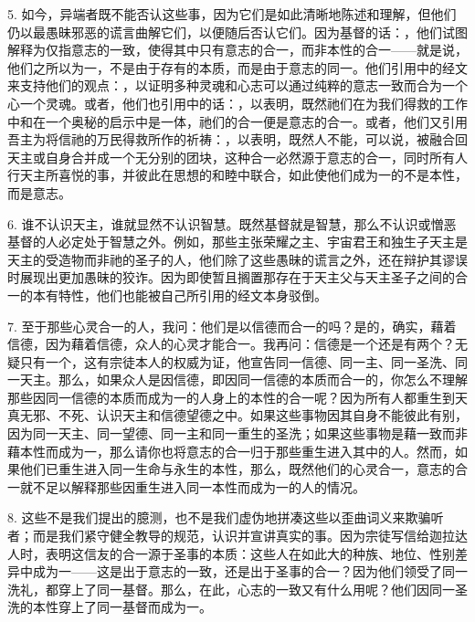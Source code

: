 5. 如今，异端者既不能否认这些事，因为它们是如此清晰地陈述和理解，但他们仍以最愚昧邪恶的谎言曲解它们，以便随后否认它们。因为基督的话：，他们试图解释为仅指意志的一致，使得其中只有意志的合一，而非本性的合一——就是说，他们之所以为一，不是由于存有的本质，而是由于意志的同一。他们引用中的经文来支持他们的观点：，以证明多种灵魂和心志可以通过纯粹的意志一致而合为一个心一个灵魂。或者，他们也引用中的话：，以表明，既然祂们在为我们得救的工作中和在一个奥秘的启示中是一体，祂们的合一便是意志的合一。或者，他们又引用吾主为将信祂的万民得救所作的祈祷：，以表明，既然人不能，可以说，被融合回天主或自身合并成一个无分别的团块，这种合一必然源于意志的合一，同时所有人行天主所喜悦的事，并彼此在思想的和睦中联合，如此使他们成为一的不是本性，而是意志。\newline{}\par

6. 谁不认识天主，谁就显然不认识智慧。既然基督就是智慧，那么不认识或憎恶基督的人必定处于智慧之外。例如，那些主张荣耀之主、宇宙君王和独生子天主是天主的受造物而非祂的圣子的人，他们除了这些愚昧的谎言之外，还在辩护其谬误时展现出更加愚昧的狡诈。因为即使暂且搁置那存在于天主父与天主圣子之间的合一的本有特性，他们也能被自己所引用的经文本身驳倒。\newline{}\par

7. 至于那些心灵合一的人，我问：他们是以信德而合一的吗？是的，确实，藉着信德，因为藉着信德，众人的心灵才能合一。我再问：信德是一个还是有两个？无疑只有一个，这有宗徒本人的权威为证，他宣告同一信德、同一主、同一圣洗、同一天主。那么，如果众人是因信德，即因同一信德的本质而合一的，你怎么不理解那些因同一信德的本质而成为一的人身上的本性的合一呢？因为所有人都重生到天真无邪、不死、认识天主和信德望德之中。如果这些事物因其自身不能彼此有别，因为同一天主、同一望德、同一主和同一重生的圣洗；如果这些事物是藉一致而非藉本性而成为一，那么请你也将意志的合一归于那些重生进入其中的人。然而，如果他们已重生进入同一生命与永生的本性，那么，既然他们的心灵合一，意志的合一就不足以解释那些因重生进入同一本性而成为一的人的情况。\newline{}\par

8. 这些不是我们提出的臆测，也不是我们虚伪地拼凑这些以歪曲词义来欺骗听者；而是我们紧守健全教导的规范，认识并宣讲真实的事。因为宗徒写信给迦拉达人时，表明这信友的合一源于圣事的本质：这些人在如此大的种族、地位、性别差异中成为一——这是出于意志的一致，还是出于圣事的合一？因为他们领受了同一洗礼，都穿上了同一基督。那么，在此，心志的一致又有什么用呢？他们因同一圣洗的本性穿上了同一基督而成为一。\newline{}\par


